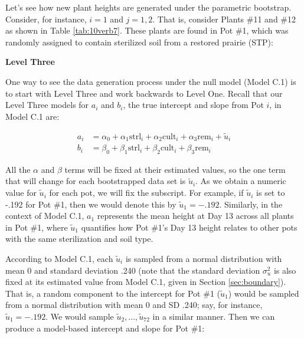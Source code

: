 \documentclass[
]{krantz}
\begin{document}
Let's see how new plant heights are generated under the parametric bootstrap. Consider, for instance, \(i=1\) and \(j=1,2\). That is, consider Plants \#11 and \#12 as shown in Table \ref{tab:10verb7}. These plants are found in Pot \#1, which was randomly assigned to contain sterilized soil from a restored prairie (STP):

\begin{table}

\caption{\label{tab:10verb7}Original data for Plants 11 and 12 from Pot 1}
\centering
{}
\end{table}

\textbf{Level Three}

One way to see the data generation process under the null model (Model C.1) is to start with Level Three and work backwards to Level One. Recall that our Level Three models for \(a_{i}\) and \(b_{i}\), the true intercept and slope from Pot \(i\), in Model C.1 are:

\begin{align*}
a_{i} & = \alpha_{0}+\alpha_{1}\textrm{strl}_{i}+\alpha_{2}\textrm{cult}_{i}+\alpha_{3}\textrm{rem}_{i}+\tilde{u}_{i} \\
b_{i} & = \beta_{0}+\beta_{1}\textrm{strl}_{i}+\beta_{2}\textrm{cult}_{i}+\beta_{3}\textrm{rem}_{i}
\end{align*}

All the \(\alpha\) and \(\beta\) terms will be fixed at their estimated values, so the one term that will change for each bootstrapped data set is \(\tilde{u}_{i}\). As we obtain a numeric value for \(\tilde{u}_{i}\) for each pot, we will fix the subscript. For example, if \(\tilde{u}_{i}\) is set to -.192 for Pot \#1, then we would denote this by \(\tilde{u}_{1}=-.192\). Similarly, in the context of Model C.1, \(a_{1}\) represents the mean height at Day 13 across all plants in Pot \#1, where \(\tilde{u}_{1}\) quantifies how Pot \#1's Day 13 height relates to other pots with the same sterilization and soil type.

According to Model C.1, each \(\tilde{u}_{i}\) is sampled from a normal distribution with mean 0 and standard deviation .240 (note that the standard deviation \(\sigma^2_{u}\) is also fixed at its estimated value from Model C.1, given in Section \ref{sec:boundary}). That is, a random component to the intercept for Pot \#1 (\(\tilde{u}_{1}\)) would be sampled from a normal distribution with mean 0 and SD .240; say, for instance, \(\tilde{u}_{1}=-.192\). We would sample \(\tilde{u}_{2},...,\tilde{u}_{72}\) in a similar manner. Then we can produce a model-based intercept and slope for Pot \#1:
\end{document}
